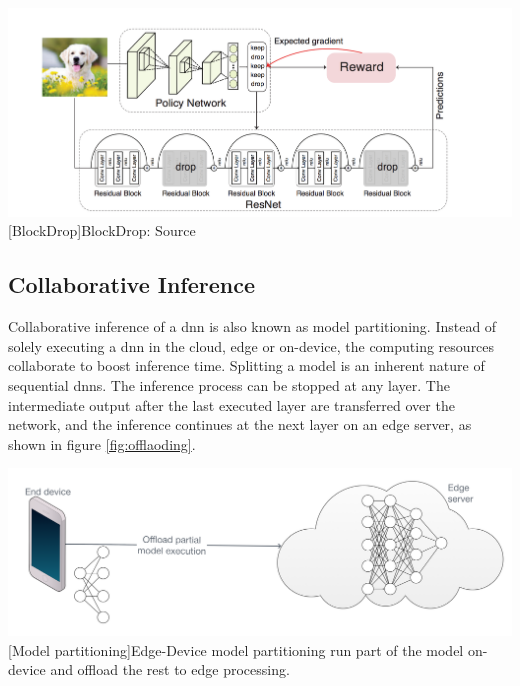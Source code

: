 \begin{enumdescript}
	
	\begin{minipage}[t]{\linewidth}    
		\centering
		\includegraphics[width=\linewidth]{figures/models/blockdrop}
		[BlockDrop]{BlockDrop: Source  \cite{wu_blockdrop:_2017}}
	\end{minipage}	
	
	
\end{enumdescript}

\subsection{Collaborative Inference}

Collaborative inference of a \gls{dnn} is also known as model partitioning. Instead of solely executing a \gls{dnn} in the cloud, edge or on-device, the computing resources collaborate to boost inference time. Splitting a model is an inherent nature of sequential \gls{dnn}s. The inference process can be stopped at any layer. The intermediate output after the last executed layer are transferred over the network, and the inference continues at the next layer on an edge server, as shown in figure \ref{fig:offlaoding}.

\begin{minipage}[t]{\linewidth}    
	\centering
	\includegraphics[width=\linewidth]{figures/models/partitioning}
	[Model partitioning]{Edge-Device model partitioning run part of the model on-device and offload the rest to edge processing.}
	\label{fig:offlaoding}
\end{minipage}

